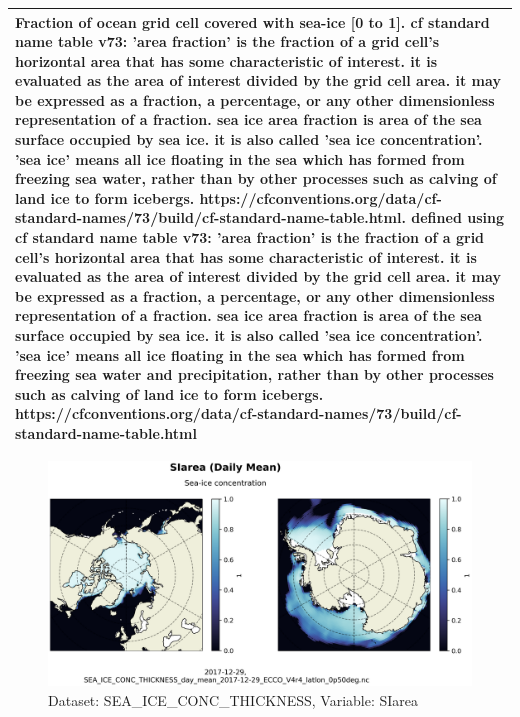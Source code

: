 \begin{longtable}{|m{}|m{}|m{}|m{}|}
\multicolumn{4}{|p{1\textwidth}|}{Fraction of ocean grid cell covered with sea-ice [0 to 1]. cf standard name table v73:  'area fraction' is the fraction of a grid cell's horizontal area that has some characteristic of interest. it is evaluated as the area of interest divided by the grid cell area. it may be expressed as a fraction, a percentage, or any other dimensionless representation of a fraction. sea ice area fraction is area of the sea surface occupied by sea ice. it is also called 'sea ice concentration'. 'sea ice' means all ice floating in the sea which has formed from freezing sea water, rather than by other processes such as calving of land ice to form icebergs. https://cfconventions.org/data/cf-standard-names/73/build/cf-standard-name-table.html. defined using cf standard name table v73: 'area fraction' is the fraction of a grid cell's horizontal area that has some characteristic of interest. it is evaluated as the area of interest divided by the grid cell area. it may be expressed as a fraction, a percentage, or any other dimensionless representation of a fraction. sea ice area fraction is area of the sea surface occupied by sea ice. it is also called 'sea ice concentration'. 'sea ice' means all ice floating in the sea which has formed from freezing sea water and precipitation, rather than by other processes such as calving of land ice to form icebergs. https://cfconventions.org/data/cf-standard-names/73/build/cf-standard-name-table.html} \\ \hline
\end{longtable}

\begin{figure}[H]
\centering
\includegraphics[scale=0.55]{../images/plots/latlon_plots/Sea-Ice_and_Snow_Concentration_and_Thickness/SIarea.png}
\caption{Dataset: SEA\_ICE\_CONC\_THICKNESS, Variable: SIarea}
\label{tab:table-SEA_ICE_CONC_THICKNESS_SIarea-Plot}
\end{figure}
\pagebreak
